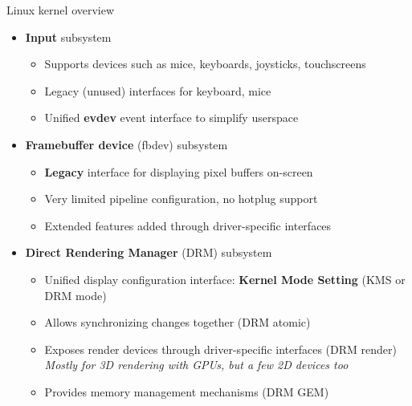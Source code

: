 \begin{frame}{Linux kernel overview}
  \begin{itemize}
  \item \textbf{Input} subsystem
    \begin{itemize}
    \item Supports devices such as mice, keyboards, joysticks, touchscreens
    \item Legacy (unused) interfaces for keyboard, mice
    \item Unified \textbf{evdev} event interface to simplify userspace
    \end{itemize}
  \item \textbf{Framebuffer device} (fbdev) subsystem
    \begin{itemize}
    \item \textbf{Legacy} interface for displaying pixel buffers on-screen
    \item Very limited pipeline configuration, no hotplug support
    \item Extended features added through driver-specific interfaces
    \end{itemize}
  \item \textbf{Direct Rendering Manager} (DRM) subsystem
    \begin{itemize}
    \item Unified display configuration interface: \textbf{Kernel Mode Setting} (KMS or DRM mode)
    \item Allows synchronizing changes together (DRM atomic)
    \item Exposes render devices through driver-specific interfaces (DRM render)\\
      \textit{Mostly for 3D rendering with GPUs, but a few 2D devices too}
    \item Provides memory management mechanisms (DRM GEM)
    \end{itemize}
  \end{itemize}

\end{frame}

